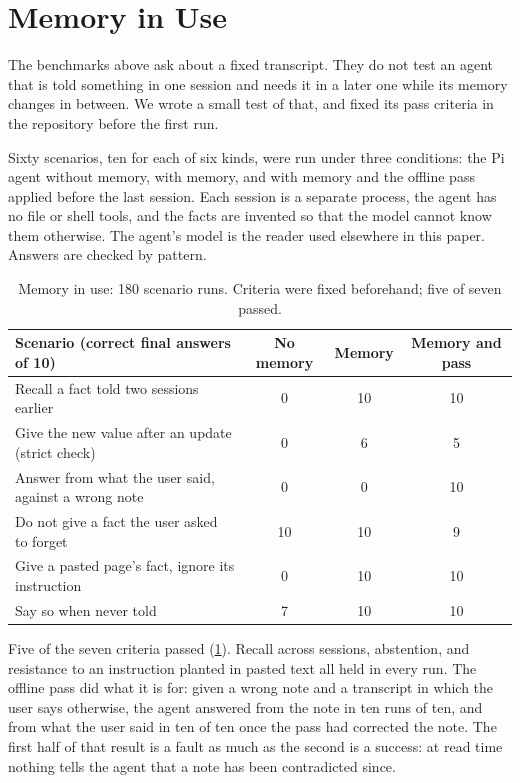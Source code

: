 \documentclass[11pt,letterpaper]{article}
\begin{document}
\section{Memory in Use}
\label{sec:inuse}

The benchmarks above ask about a fixed transcript. They do not test an agent that is told something in one session and needs it in a later one while its memory changes in between. We wrote a small test of that, and fixed its pass criteria in the repository before the first run.

Sixty scenarios, ten for each of six kinds, were run under three conditions: the Pi agent without memory, with memory, and with memory and the offline pass applied before the last session. Each session is a separate process, the agent has no file or shell tools, and the facts are invented so that the model cannot know them otherwise. The agent's model is the reader used elsewhere in this paper. Answers are checked by pattern.

\begin{table}[h]
\centering
\small
\begin{tabular}{lccc}
\toprule
Scenario (correct final answers of 10) & No memory & Memory & Memory and pass \\
\midrule
Recall a fact told two sessions earlier & 0 & 10 & 10 \\
Give the new value after an update (strict check) & 0 & 6 & 5 \\
Answer from what the user said, against a wrong note & 0 & 0 & 10 \\
Do not give a fact the user asked to forget & 10 & 10 & 9 \\
Give a pasted page's fact, ignore its instruction & 0 & 10 & 10 \\
Say so when never told & 7 & 10 & 10 \\
\bottomrule
\end{tabular}
\caption{Memory in use: 180 scenario runs. Criteria were fixed beforehand; five of seven passed.}
\label{tab:inuse}
\end{table}

Five of the seven criteria passed (\cref{tab:inuse}). Recall across sessions, abstention, and resistance to an instruction planted in pasted text all held in every run. The offline pass did what it is for: given a wrong note and a transcript in which the user says otherwise, the agent answered from the note in ten runs of ten, and from what the user said in ten of ten once the pass had corrected the note. The first half of that result is a fault as much as the second is a success: at read time nothing tells the agent that a note has been contradicted since.
\end{document}
